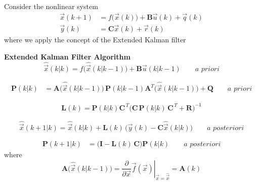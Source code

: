 \documentclass[11pt,a4paper,oneside]{book}
\numberwithin{equation}{section}
\theoremstyle{it}
\theoremstyle{definition}
\begin{document}
\noindent Consider the nonlinear system
\begin{equation}\label{kfp_1_nonlinear}
	\begin{aligned}
		\vec{x}(k+1) &= f\Big(\vec{x}(k)\Big)+\mathbf{B}\vec{u}(k) + 
		\vec{q}(k)\\[6pt]
		\vec{y}(k) &= \mathbf{C}\vec{x}(k) + \vec{r}(k)
	\end{aligned}
\end{equation}
where we apply the concept of the Extended Kalman filter
\begin{mybox}
	\noindent\textbf{Extended Kalman Filter Algorithm}
	\begin{equation}\label{ks1}
		\hat{\vec{x}}\left(k|k\right) = 
		f\Big(\hat{\vec{x}}\left(k|k-1\right)\Big) + \mathbf{B} 
		\vec{u}\left(k|k-1\right) \qquad \textit{a priori}
	\end{equation}
	
	\begin{equation}\label{ks2}
		\begin{aligned}
			\mathbf{P}\left(k|k\right) &= 
			\mathbf{A}\Big(\hat{\vec{x}}\left(k|k-1\right)\Big)\,\mathbf{P}\left(k|k-1\right)
			 \mathbf{A}^T\Big(\hat{\vec{x}}\left(k|k-1\right)\Big) + \mathbf{Q} 
			\qquad \textit{a priori}
		\end{aligned}
	\end{equation}
	
	\begin{equation}\label{ks3}
		\begin{aligned}
			\mathbf{L}(k) = 
			\mathbf{P}(k|k)\mathbf{C}^{\,T}\Big(\mathbf{C}\,\mathbf{P}(k|k)\,\mathbf{C}^{\,T}+\mathbf{R}\Big)^{-1}
		\end{aligned}
	\end{equation}
	
	\begin{equation}\label{ks4}
		\hat{\vec{x}}\left(k+1|k\right) = \hat{\vec{x}}\left(k|k\right) + 
		\mathbf{L}(k)\, \Big(\vec{y}(k) - 
		\mathbf{C}\hat{\vec{x}}\left(k|k\right)\Big) \qquad \textit{a 
		posteriori}
	\end{equation}
	
	\begin{equation}\label{ks5}
		\begin{aligned}
			\mathbf{P}\left(k+1|k\right) &= 
			\Big(\mathbf{I}-\mathbf{L}(k)\,\mathbf{C} \Big) 
			\mathbf{P}\left(k|k\right)  \qquad \textit{a posteriori}
		\end{aligned}
	\end{equation}
	where 
	\begin{equation}
		\mathbf{A}\Big(\hat{\vec{x}}\left(k|k-1\right)\Big) = \left. 
		\frac{\partial}{\partial 
		\vec{x}}\vec{f}(\vec{x})\right|_{\vec{x}=\hat{\vec{x}}} = \mathbf{A}(k)
	\end{equation}
\end{mybox}
\end{document}

